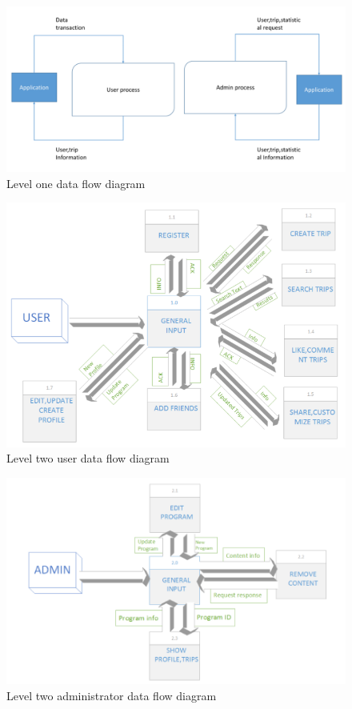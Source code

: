 \begin{figure}[!htbp]
\centering
\includegraphics[width=\textwidth]{projectChapters/images/dataflow2.png}
\caption{Level one data flow diagram}
\label{fig:dataflow2}
\end{figure}

\begin{figure}[!htbp]
\centering
\includegraphics[width=\textwidth]{projectChapters/images/dataflow3.png}
\caption{Level two user data flow diagram}
\label{fig:userdataflow}
\end{figure}

\begin{figure}[!htbp]
\centering
\includegraphics[width=\textwidth]{projectChapters/images/dataflow4.png}
\caption{Level two administrator data flow diagram}
\label{fig:admindataflow}
\end{figure}





